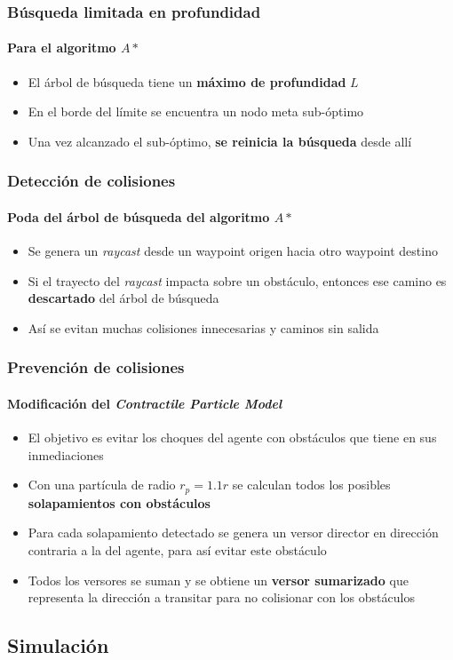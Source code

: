 \documentclass[hyperref={pdfpagelayout=SinglePage}]{beamer}
\begin{document}
\begin{frame}
\frametitle{Búsqueda limitada en profundidad}
\framesubtitle{Para el algoritmo $A*$}
\begin{itemize}
	\item El árbol de búsqueda tiene un \textbf{máximo de profundidad} $L$
	\item En el borde del límite se encuentra un nodo meta sub-óptimo
	\item Una vez alcanzado el sub-óptimo, \textbf{se reinicia la búsqueda} desde allí
\end{itemize}
\end{frame}

\begin{frame}
\frametitle{Detección de colisiones}
\framesubtitle{Poda del árbol de búsqueda del algoritmo $A*$}
\begin{itemize}
	\item Se genera un \textit{raycast} desde un waypoint origen hacia otro waypoint destino
	\item Si el trayecto del \textit{raycast} impacta sobre un obstáculo, entonces ese camino es \textbf{descartado} del árbol de búsqueda
	\item Así se evitan muchas colisiones innecesarias y caminos sin salida
\end{itemize}
\end{frame}

\begin{frame}
\frametitle{Prevención de colisiones}
\framesubtitle{Modificación del \textit{Contractile Particle Model}}
\begin{itemize}
	\item El objetivo es evitar los choques del agente con obstáculos que tiene en sus inmediaciones
	\item Con una partícula de radio $r_{p} = 1.1 r$ se calculan todos los posibles \textbf{solapamientos con obstáculos}
	\item Para cada solapamiento detectado se genera un versor director en dirección contraria a la del agente, para así evitar este obstáculo 
	\item Todos los versores se suman y se obtiene un \textbf{versor sumarizado} que representa la dirección a transitar para no colisionar con los obstáculos
\end{itemize}
\end{frame}

\subsection{Simulación}
\end{document}
